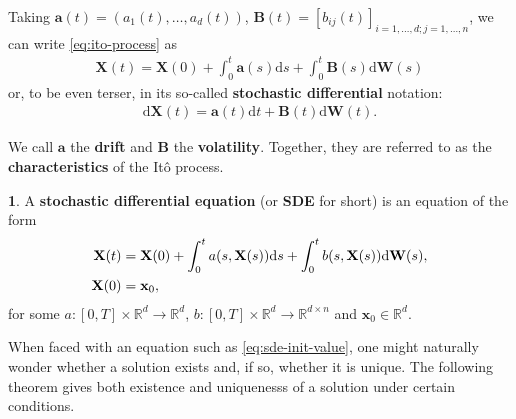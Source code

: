 \documentclass[english]{article}
\numberwithin{equation}{section}
\numberwithin{figure}{section}
\theoremstyle{bolddescit}
\theoremstyle{definition}
\newtheorem{definition}[theorem]{\protect\definitionname}
\theoremstyle{definition}
\theoremstyle{plain}
\theoremstyle{plain}
\theoremstyle{bolddesc}
\theoremstyle{plain}
\theoremstyle{remark}
\providecommand{\definitionname}{Definition}
\begin{document}
Taking $\mathbf{a}(t) = (a_1(t),\ldots,a_d(t))$, $\mathbf{B}(t) = [b_{ij}(t)]_{i=1,\ldots,d;j=1,\ldots,n}$, we can write \eqref{eq:ito-process} as
\begin{align*}
  \mathbf{X}(t) = \mathbf{X}(0) + \int_0^t \mathbf{a}(s) \mathrm{d}s + \int_0^t \mathbf{B}(s) \mathrm{d}\mathbf{W}(s)
\end{align*}
or, to be even terser, in its so-called \textbf{stochastic differential} notation:
\begin{align*}
  \mathrm{d}\mathbf{X}(t) = \mathbf{a}(t) \mathrm{d}t + \mathbf{B}(t) \mathrm{d}\mathbf{W}(t).
\end{align*}

We call $\mathbf{a}$ the \textbf{drift} and $\mathbf{B}$ the \textbf{volatility}. Together, they are referred to as the \textbf{characteristics} of the It\^o process.

\begin{definition}
  A \textbf{stochastic differential equation} (or \textbf{SDE} for short) is an equation of the form
  \begin{align}\label{eq:sde-init-value}
    \mathbf{X}(t) &= \mathbf{X}(0) + \int_0^t a(s, \mathbf{X}(s)) \mathrm{d}s + \int_0^t b(s, \mathbf{X}(s)) \mathrm{d}\mathbf{W}(s),\\
    \mathbf{X}(0) &= \mathbf{x}_0,\notag
  \end{align}
  for some $a : [0,T] \times \mathbb{R}^{d} \to \mathbb{R}^d$, $b : [0,T] \times \mathbb{R}^{d} \to \mathbb{R}^{d \times n}$ and $\mathbf{x}_0 \in \mathbb{R}^d$.
\end{definition}

When faced with an equation such as \eqref{eq:sde-init-value}, one might naturally wonder whether a solution exists and, if so, whether it is unique. The following theorem gives both existence and uniquenesss of a solution under certain conditions.
\end{document}
